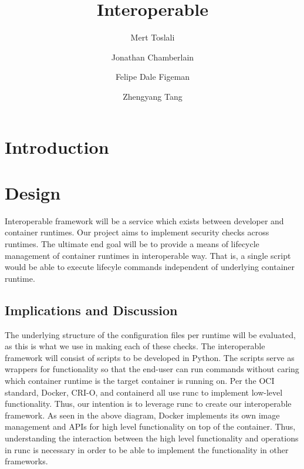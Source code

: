 \documentclass[times, twoside, watermark]{zHenriquesLab-StyleBioRxiv}
\begin{document}
\title{Interoperable}


\author[1]{Mert Toslali}
\author[1]{Jonathan Chamberlain}
\author[1]{Felipe Dale Figeman}
\author[1]{Zhengyang Tang}


\maketitle

\begin{abstract}

\end {abstract}



\section*{Introduction}


\section*{Design}
Interoperable framework will be a service which exists between developer and container runtimes. Our project aims to implement security checks across runtimes. The ultimate end goal will be to provide a means of lifecycle management of container runtimes in interoperable way. That is, a single script would be able to execute lifecyle commands independent of underlying container runtime.

\subsection*{Implications and Discussion}

The underlying structure of the configuration files per runtime will be evaluated, as this is what we use in making each of these checks.
The interoperable framework will consist of scripts to be developed in Python.
The scripts serve as wrappers for functionality so that the end-user can run commands without caring which container runtime is the target container is running on.
Per the OCI standard, Docker, CRI-O, and containerd all use runc to implement low-level functionality. Thus, our intention is to leverage runc to create our interoperable framework. As seen in the above diagram, Docker implements its own image management and APIs for high level functionality on top of the container. Thus, understanding the interaction between the high level functionality and operations in runc is necessary in order to be able to implement the functionality in other frameworks.

\end{document}
